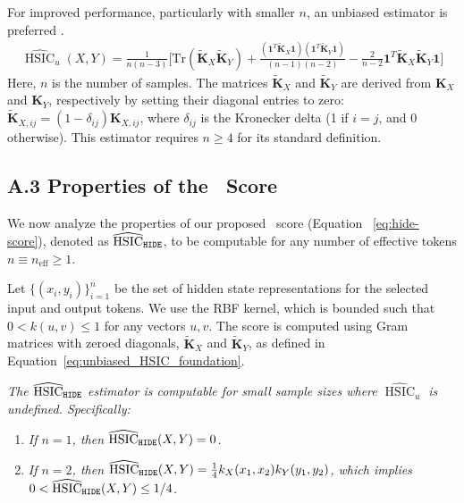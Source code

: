 For improved performance, particularly with smaller $n$, an unbiased estimator is preferred \citep{JMLR:v13:song12a}. 
\begin{multline}
\widehat{\operatorname{HSIC}}_u(X,Y) = \frac{1}{n(n-3)} \bigg[ \text{Tr}(\tilde{\mathbf{K}}_X\tilde{\mathbf{K}}_Y) +   \frac{(\mathbf{1}^T \tilde{\mathbf{K}}_X \mathbf{1}) (\mathbf{1}^T \tilde{\mathbf{K}}_Y \mathbf{1})}{(n-1)(n-2)} -  \frac{2}{n-2} \mathbf{1}^T \tilde{\mathbf{K}}_X\tilde{\mathbf{K}}_Y \mathbf{1} \bigg]
\label{eq:unbiased_HSIC_foundation}
\end{multline}
Here, $n$ is the number of samples. The matrices $\tilde{\mathbf{K}}_X$ and $\tilde{\mathbf{K}}_Y$ are derived from $\mathbf{K}_X$ and $\mathbf{K}_Y$, respectively by setting their diagonal entries to zero: $\tilde{\mathbf{K}}_{X,ij} = (1-\delta_{ij})\mathbf{K}_{X,ij}$, where $\delta_{ij}$ is the Kronecker delta  (1 if $i=j$, and 0 otherwise). This estimator requires $n \ge 4$ for its standard definition.

\subsection*{A.3 Properties of the \method~Score}
\label{sec:properties-hide}
We now analyze the properties of our proposed \method~score (Equation ~\ref{eq:hide-score}), denoted as \(\widehat{\operatorname{HSIC}}_{\texttt{HIDE}}\),  to be computable for any number of effective tokens \(n \equiv n_{\text{eff}} \ge 1\).

Let \(\{(x_i,y_i)\}_{i=1}^{n}\) be the set of hidden state representations for the selected input and output tokens. We use the RBF kernel, which is bounded such that \(0 < k(u,v) \le 1\) for any vectors \(u,v\). The score is computed using Gram matrices with zeroed diagonals, \(\tilde{\mathbf{K}}_X\) and \(\tilde{\mathbf{K}}_Y\), as defined in Equation~\ref{eq:unbiased_HSIC_foundation}.

\begin{lemma}
\label{lem:small_n_properties}
\textit{The \(\widehat{\operatorname{HSIC}}_{\texttt{HIDE}}\) estimator is computable for small sample sizes where \(\widehat{\operatorname{HSIC}}_u\) is undefined. Specifically:}
\begin{enumerate}
    \item[\textit{(i)}] \textit{If \(n=1\), then \(\widehat{\operatorname{HSIC}}_{\texttt{HIDE}}(X,Y) = 0\).}
    \item[\textit{(ii)}] \textit{If \(n=2\), then \(\widehat{\operatorname{HSIC}}_{\texttt{HIDE}}(X,Y) = \frac{1}{4} k_X(x_1,x_2)k_Y(y_1,y_2)\), which implies \(0 < \widehat{\operatorname{HSIC}}_{\texttt{HIDE}}(X,Y) \le 1/4\).}
\end{enumerate}
\end{lemma}

